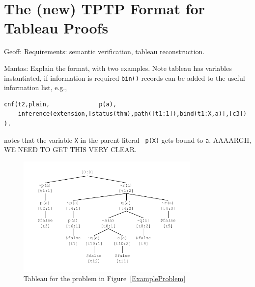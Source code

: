 \documentclass[runningheads]{llncs}
\begin{document}
\section{The (new) TPTP Format for Tableau Proofs}
\label{Tableau}

Geoff: Requirements: semantic verification, tableau reconstruction.

Mantas: Explain the format, with two examples.
Note tableau has variables instantiated, if information is required {\tt bin()} records can be
added to the useful information list, e.g., 

\begin{verbatim}
cnf(t2,plain,              p(a),
    inference(extension,[status(thm),path([t1:1]),bind(t1:X,a)],[c3]) ).
\end{verbatim}

notes that the variable {\tt X} in the parent literal {\tt ~p(X)} gets bound to {\tt a}.
AAAARGH, WE NEED TO GET THIS VERY CLEAR.

\begin{figure}[htb]
\centering
\includegraphics[width=0.8\textwidth]{SimpleTableau.pdf}
\vspace*{-1em}
\caption{Tableau for the problem in Figure~\ref{ExampleProblem}}
\label{SimpleTableau}
\end{figure}
\end{document}
